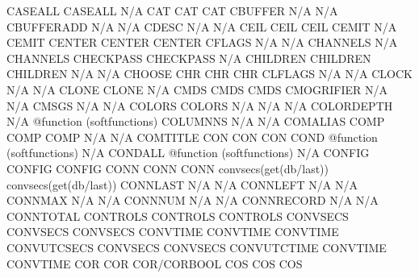 \documentclass[letterpaper,10pt,english]{sphinxmanual}
\begin{document}
\begin{sphinxVerbatim}[commandchars=\\\{\}]
CASEALL                 CASEALL                      N/A
CAT                     CAT                          CAT
CBUFFER                 N/A                          N/A
CBUFFERADD              N/A                          N/A
CDESC                   N/A                          N/A
CEIL                    CEIL                         CEIL
CEMIT                   N/A                          CEMIT
CENTER                  CENTER                       CENTER
CFLAGS                  N/A                          N/A
CHANNELS                N/A                          CHANNELS
CHECKPASS               CHECKPASS                    N/A
CHILDREN                CHILDREN                     CHILDREN
N/A                     N/A                          CHOOSE
CHR                     CHR                          CHR
CLFLAGS                 N/A                          N/A
CLOCK                   N/A                          N/A
CLONE                   CLONE                        N/A
CMDS                    CMDS                         CMDS
CMOGRIFIER              N/A                          N/A
CMSGS                   N/A                          N/A
COLORS                  COLORS                       N/A
N/A                     N/A                          COLORDEPTH
N/A                     @function (softfunctions)    COLUMNNS
N/A                     N/A                          COMALIAS
COMP                    COMP                         COMP
N/A                     N/A                          COMTITLE
CON                     CON                          CON
COND                    @function (softfunctions)    N/A
CONDALL                 @function (softfunctions)    N/A
CONFIG                  CONFIG                       CONFIG
CONN                    CONN                         CONN
convsecs(get(\PYGZsh{}db/last)) convsecs(get(\PYGZsh{}db/last))      CONNLAST
N/A                     N/A                          CONNLEFT
N/A                     N/A                          CONNMAX
N/A                     N/A                          CONNNUM
N/A                     N/A                          CONNRECORD
N/A                     N/A                          CONNTOTAL
CONTROLS                CONTROLS                     CONTROLS
CONVSECS                CONVSECS                     CONVSECS
CONVTIME                CONVTIME                     CONVTIME
CONVUTCSECS             CONVSECS                     CONVSECS
CONVUTCTIME             CONVTIME                     CONVTIME
COR                     COR                          COR/CORBOOL
COS                     COS                          COS

\end{sphinxVerbatim}
\end{document}
